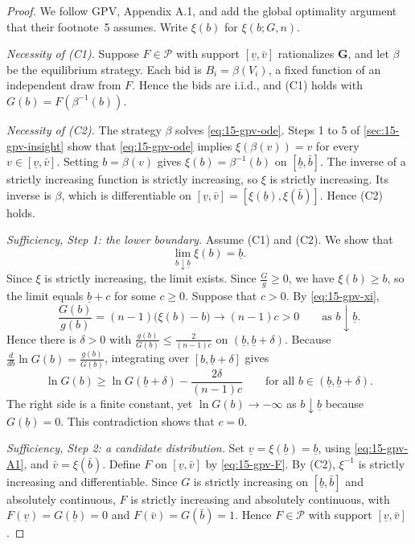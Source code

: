 \begin{proof}
We follow GPV, Appendix A.1, and add the global optimality argument that their footnote~5 assumes. Write $\xi(b)$ for $\xi(b;G,n)$.

\emph{Necessity of (C1).} Suppose $F\in\mathcal P$ with support $[\underline v,\bar v]$ rationalizes $\mathbf G$, and let $\beta$ be the equilibrium strategy. Each bid is $B_i=\beta(V_i)$, a fixed function of an independent draw from $F$. Hence the bids are i.i.d., and (C1) holds with $G(b)=F(\beta^{-1}(b))$.

\emph{Necessity of (C2).} The strategy $\beta$ solves \eqref{eq:15-gpv-ode}. Steps 1 to 5 of \cref{sec:15-gpv-insight} show that \eqref{eq:15-gpv-ode} implies $\xi(\beta(v))=v$ for every $v\in[\underline v,\bar v]$. Setting $b=\beta(v)$ gives $\xi(b)=\beta^{-1}(b)$ on $[\underline b,\bar b]$. The inverse of a strictly increasing function is strictly increasing, so $\xi$ is strictly increasing. Its inverse is $\beta$, which is differentiable on $[\underline v,\bar v]=[\xi(\underline b),\xi(\bar b)]$. Hence (C2) holds.

\emph{Sufficiency, Step 1: the lower boundary.} Assume (C1) and (C2). We show that
\begin{equation}\label{eq:15-gpv-A1}
\lim_{b\downarrow\underline b}\xi(b)=\underline b.
\end{equation}
Since $\xi$ is strictly increasing, the limit exists. Since $\frac{G}{g}\ge0$, we have $\xi(b)\ge b$, so the limit equals $\underline b+c$ for some $c\ge0$. Suppose that $c>0$. By \eqref{eq:15-gpv-xi},
\[
\frac{G(b)}{g(b)}=(n-1)\big(\xi(b)-b\big)\longrightarrow(n-1)c>0\qquad\text{as }b\downarrow\underline b.
\]
Hence there is $\delta>0$ with $\frac{g(b)}{G(b)}\le\frac{2}{(n-1)c}$ on $(\underline b,\underline b+\delta)$. Because $\frac{d}{db}\ln G(b)=\frac{g(b)}{G(b)}$, integrating over $[b,\underline b+\delta]$ gives
\[
\ln G(b)\ge\ln G(\underline b+\delta)-\frac{2\delta}{(n-1)c}\qquad\text{for all }b\in(\underline b,\underline b+\delta).
\]
The right side is a finite constant, yet $\ln G(b)\to-\infty$ as $b\downarrow\underline b$ because $G(\underline b)=0$. This contradiction shows that $c=0$.

\emph{Sufficiency, Step 2: a candidate distribution.} Set $\underline v=\xi(\underline b)=\underline b$, using \eqref{eq:15-gpv-A1}, and $\bar v=\xi(\bar b)$. Define $F$ on $[\underline v,\bar v]$ by \eqref{eq:15-gpv-F}. By (C2), $\xi^{-1}$ is strictly increasing and differentiable. Since $G$ is strictly increasing on $[\underline b,\bar b]$ and absolutely continuous, $F$ is strictly increasing and absolutely continuous, with $F(\underline v)=G(\underline b)=0$ and $F(\bar v)=G(\bar b)=1$. Hence $F\in\mathcal P$ with support $[\underline v,\bar v]$.


\end{proof}
